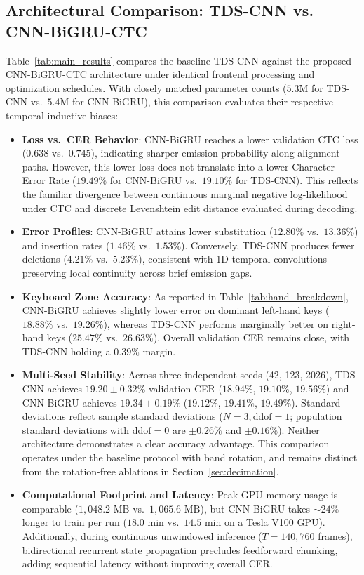 \documentclass{article}
\begin{document}
\subsection{Architectural Comparison: TDS-CNN vs. CNN-BiGRU-CTC}
Table~\ref{tab:main_results} compares the baseline TDS-CNN against the proposed CNN-BiGRU-CTC architecture under identical frontend processing and optimization schedules. With closely matched parameter counts ($5.3\text{M}$ for TDS-CNN vs.\ $5.4\text{M}$ for CNN-BiGRU), this comparison evaluates their respective temporal inductive biases:
\begin{itemize}
    \item \textbf{Loss vs.\ CER Behavior}: CNN-BiGRU reaches a lower validation CTC loss ($\mathbf{0.638}$ vs.\ $0.745$), indicating sharper emission probability along alignment paths. However, this lower loss does not translate into a lower Character Error Rate ($19.49\%$ for CNN-BiGRU vs.\ $\mathbf{19.10\%}$ for TDS-CNN). This reflects the familiar divergence between continuous marginal negative log-likelihood under CTC and discrete Levenshtein edit distance evaluated during decoding.
    \item \textbf{Error Profiles}: CNN-BiGRU attains lower substitution ($\mathbf{12.80\%}$ vs.\ $13.36\%$) and insertion rates ($\mathbf{1.46\%}$ vs.\ $1.53\%$). Conversely, TDS-CNN produces fewer deletions ($4.21\%$ vs.\ $5.23\%$), consistent with 1D temporal convolutions preserving local continuity across brief emission gaps.
    \item \textbf{Keyboard Zone Accuracy}: As reported in Table~\ref{tab:hand_breakdown}, CNN-BiGRU achieves slightly lower error on dominant left-hand keys ($\mathbf{18.88\%}$ vs.\ $19.26\%$), whereas TDS-CNN performs marginally better on right-hand keys ($25.47\%$ vs.\ $26.63\%$). Overall validation CER remains close, with TDS-CNN holding a $0.39\%$ margin.
    \item \textbf{Multi-Seed Stability}: Across three independent seeds (42, 123, 2026), TDS-CNN achieves $19.20 \pm 0.32\%$ validation CER ($18.94\%$, $19.10\%$, $19.56\%$) and CNN-BiGRU achieves $19.34 \pm 0.19\%$ ($19.12\%$, $19.41\%$, $19.49\%$). Standard deviations reflect sample standard deviations ($N=3, \text{ddof}=1$; population standard deviations with $\text{ddof}=0$ are $\pm 0.26\%$ and $\pm 0.16\%$). Neither architecture demonstrates a clear accuracy advantage. This comparison operates under the baseline protocol with band rotation, and remains distinct from the rotation-free ablations in Section~\ref{sec:decimation}.
    \item \textbf{Computational Footprint and Latency}: Peak GPU memory usage is comparable ($1{,}048.2\text{ MB}$ vs.\ $1{,}065.6\text{ MB}$), but CNN-BiGRU takes $\sim 24\%$ longer to train per run ($18.0\text{ min}$ vs.\ $14.5\text{ min}$ on a Tesla V100 GPU). Additionally, during continuous unwindowed inference ($T=140{,}760$ frames), bidirectional recurrent state propagation precludes feedforward chunking, adding sequential latency without improving overall CER.
\end{itemize}
\end{document}

